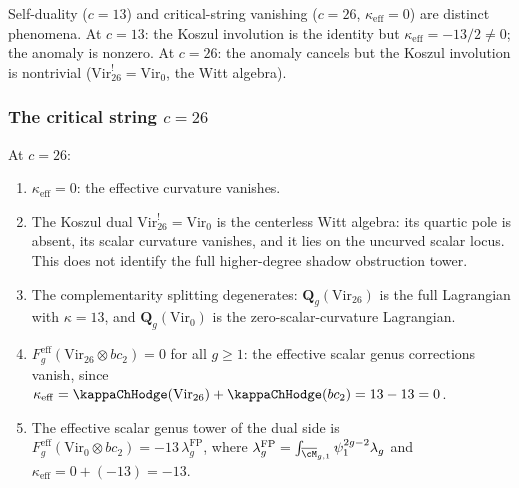 \begin{remark}[$c = 13$ is not the critical string]
\label{rem:gravity-13-not-critical}
Self-duality ($c = 13$) and critical-string vanishing
($c = 26$, $\kappa_{\mathrm{eff}} = 0$) are distinct
phenomena. At $c = 13$: the Koszul involution is the identity
but $\kappa_{\mathrm{eff}} = -13/2 \ne 0$; the anomaly is
nonzero. At $c = 26$: the anomaly cancels but the Koszul
involution is nontrivial ($\mathrm{Vir}_{26}^! =
\mathrm{Vir}_0$, the Witt algebra).
\end{remark}

\subsubsection*{The critical string $c = 26$}

\begin{proposition}[Anomaly cancellation at $c = 26$;
\ClaimStatusProvedHere]
\label{prop:gravity-c26-anomaly-cancellation}
At $c = 26$:
\begin{enumerate}[label=\textup{(\roman*)}]
\item $\kappa_{\mathrm{eff}} = 0$: the effective curvature
 vanishes.
\item The Koszul dual $\mathrm{Vir}_{26}^!
 = \mathrm{Vir}_0$ is the centerless Witt algebra: its quartic
 pole is absent, its scalar curvature vanishes, and it lies on the
 uncurved scalar locus. This does not identify the full
 higher-degree shadow obstruction tower.
\item The complementarity splitting degenerates:
 $\mathbf{Q}_g(\mathrm{Vir}_{26})$ is the full Lagrangian
 with $\kappa = 13$, and $\mathbf{Q}_g(\mathrm{Vir}_0)$
 is the zero-scalar-curvature Lagrangian.
\item $F_g^{\mathrm{eff}}(\mathrm{Vir}_{26} \otimes bc_2) = 0$ for all $g \ge 1$:
 the effective scalar genus corrections vanish,
 since $\kappa_{\mathrm{eff}} = \kappaChHodge(\mathrm{Vir}_{26}) + \kappaChHodge(bc_2)
 = 13 - 13 = 0$.
\item The effective scalar genus tower of the dual side is
 $F_g^{\mathrm{eff}}(\mathrm{Vir}_0 \otimes bc_2) =
 -13\,\lambda_g^{\mathrm{FP}}$, where
 $\lambda_g^{\mathrm{FP}}
 =\int_{\overline{\cM}_{g,1}}\psi_1^{2g-2}\lambda_g$ and
 $\kappa_{\mathrm{eff}} = 0 + (-13) = -13$.
\end{enumerate}
\end{proposition}

